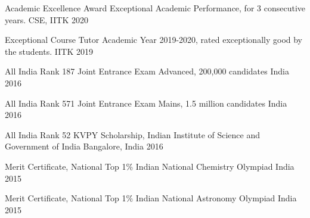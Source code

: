 
\begin{cvhonors}

  \cvhonor
    {Academic Excellence Award} %
    {Exceptional Academic Performance, for 3 consecutive years.} %
    {CSE, IITK} %
    {2020} %

  \cvhonor
    {Exceptional Course Tutor} %
    {Academic Year 2019-2020, rated exceptionally good by the students.} %
    {IITK} %
    {2019} %

  \cvhonor
    {All India Rank 187} %
    {Joint Entrance Exam Advanced, 200,000 candidates} %
    {India} %
    {2016} %

  \cvhonor
    {All India Rank 571} %
    {Joint Entrance Exam Mains, 1.5 million candidates} %
    {India} %
    {2016} %

  \cvhonor
    {All India Rank 52} %
    {KVPY Scholarship, Indian Institute of Science and Government of India} %
    {Bangalore, India} %
    {2016} %

  \cvhonor
    {Merit Certificate, National Top 1\%} %
    {Indian National Chemistry Olympiad} %
    {India} %
    {2015} %

  \cvhonor
    {Merit Certificate, National Top 1\%} %
    {Indian National Astronomy Olympiad} %
    {India} %
    {2015} %

\end{cvhonors}
